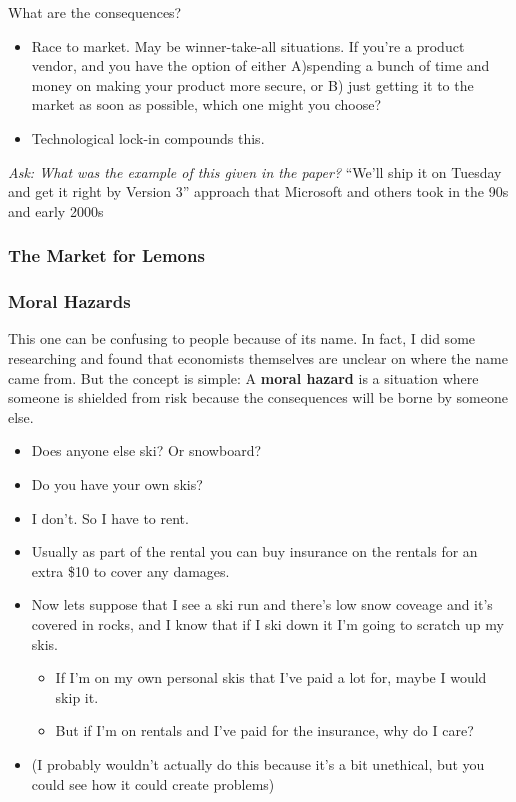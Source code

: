 \documentclass[11pt]{article}
\begin{document}
What are the consequences? 
\begin{itemize}
    \item Race to market. May be winner-take-all situations. If you're a product vendor, and you have the option of either A)spending a bunch of time and money on making your product more secure, or B) just getting it to the market as soon as possible, which one might you choose?
    \item Technological lock-in compounds this.
\end{itemize}

{\it Ask: What was the example of this given in the paper?} ``We'll ship it on Tuesday and get it right by Version 3'' approach that Microsoft and others took in the 90s and early 2000s


\subsubsection{The Market for Lemons}

\subsubsection{Moral Hazards}

This one can be confusing to people because of its name. In fact, I did some researching and found that economists themselves are unclear on where the name came from. But the concept is simple: A {\bf moral hazard} is a situation where someone is shielded from risk because the consequences will be borne by someone else.
\begin{itemize}
    \item Does anyone else ski? Or snowboard? 
    \item Do you have your own skis?
    \item I don't. So I have to rent. 
    \item Usually as part of the rental you can buy insurance on the rentals for an extra \$10 to cover any damages. 
    \item Now lets suppose that I see a ski run and there's low snow coveage and it's covered in rocks, and I know that if I ski down it I'm going to scratch up my skis. 
    \begin{itemize}
        \item If I'm on my own personal skis that I've paid a lot for, maybe I would skip it. 
        \item But if I'm on rentals and I've paid for the insurance, why do I care?
    \end{itemize}
    \item (I probably wouldn't actually do this because it's a bit unethical, but you could see how it could create problems)
\end{itemize}
\end{document}
